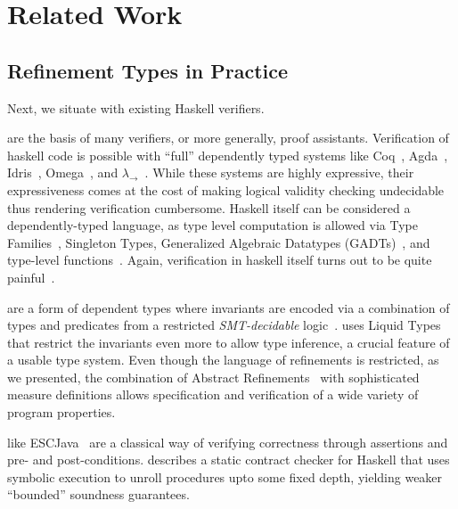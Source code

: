 \chapter{Related Work}\label{chapter:related}

\section{Refinement Types in Practice}\label{sec:realword:related}

Next, we situate \toolname with 
existing Haskell verifiers.

 are the basis of many verifiers, 
or more generally, proof assistants.
%
Verification of haskell code is possible with
``full'' dependently typed systems like Coq~\cite{coq-book}, 
Agda~\cite{norell07}, Idris~\cite{Brady13}, Omega~\cite{Sheard06}, and
 {$\lambda_\rightarrow$}~\cite{LohMS10}.
 While these systems are highly expressive,
their expressiveness comes at the cost of making logical validity checking undecidable
thus rendering verification cumbersome.	
 Haskell itself can be considered a dependently-typed language,
 as type level computation is allowed via 
 Type Families~\cite{McBride02},
 Singleton Types\cite{Weirich12}, 
 Generalized Algebraic  Datatypes (GADTs)~\cite{JonesVWW06, SchrijversJSV09}, 
 and type-level functions~\cite{ChakravartyKJ05}.
Again, 
verification in haskell itself turns out to be quite painful~\cite{LindleyM13}.

 are a form of dependent types where 
invariants are encoded via a combination of types and predicates
from a restricted \emph{SMT-decidable} 
logic~\cite{Rushby98,pfenningxi98,Dunfield07,GordonTOPLAS2011}. 
%
\toolname uses Liquid Types~\cite{LiquidPLDI09} 
that restrict the invariants even more
to allow type inference, a crucial feature of a usable type system.
%
Even though the language of refinements is restricted,
as we presented, the combination of
Abstract Refinements~\cite{vazou13} 
with sophisticated measure definitions 
allows specification and verification of a wide variety 
of program properties.

like ESCJava~\cite{ESCJava} are a classical way of verifying 
correctness through assertions and pre- and post-conditions. 
%
\cite{XuPOPL09} describes a static contract checker for 
Haskell that uses symbolic execution to unroll procedures
upto some fixed depth, yielding weaker ``bounded'' soundness
guarantees.
% 

